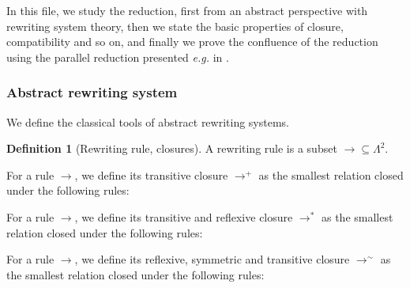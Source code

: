 \documentclass{article}
\theoremstyle{definition}
\newtheorem{defi}{Definition}
\begin{document}
In this file, we study the reduction, first from an abstract perspective with rewriting system theory, then
we state the basic properties of closure, compatibility and so on, and finally we prove the confluence of the
reduction using the parallel reduction presented \textit{e.g.} in \cite{sorensen2006lectures}.

\subsubsection{Abstract rewriting system}

We define the classical tools of abstract rewriting systems.

\begin{defi}[Rewriting rule, closures]
    A rewriting rule is a subset $\to\subseteq \Lambda^2$.
    
    For a rule $\to$, we define its transitive closure $\to^+$ as the smallest relation closed under the
    following rules:
    \begin{center}
        \begin{prooftree}
        \end{prooftree}
        \qquad
        \begin{prooftree}
        \end{prooftree}
    \end{center}

    For a rule $\to$, we define its transitive and reflexive closure $\to^*$ as the smallest relation closed
    under the following rules:
    \begin{center}
        \begin{prooftree}
        \end{prooftree}
        \qquad
        \begin{prooftree}
        \end{prooftree}
    \end{center}

    For a rule $\to$, we define its reflexive, symmetric and transitive closure $\to^\sim$ as the smallest
    relation closed under the following rules:
    \begin{center}
        \begin{prooftree}
        \end{prooftree}
        \qquad
        \begin{prooftree}
        \end{prooftree}
        \qquad
        \begin{prooftree}
        \end{prooftree}
    \end{center}
\end{defi}
\end{document}
